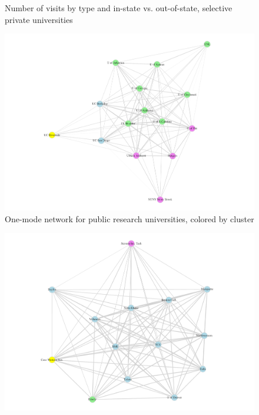 \documentclass[
  12pt,
]{article}
\begin{document}
\begin{landscape}
\begin{figure}
\caption{Number of visits by type and in-state vs. out-of-state, selective private universities}\label{fig:events-count-privu}
\end{figure}

\newpage

\begin{figure}

{\centering \includegraphics[width=2\linewidth]{../assets/figures/plot_1mode_pubu} 

}

\caption{One-mode network for public research universities, colored by cluster}\label{fig:plot-1mode-pubu}
\end{figure}

\begin{figure}

{\centering \includegraphics[width=2\linewidth]{../assets/figures/plot_1mode_privu} 

}
\end{figure}
\end{landscape}
\end{document}
